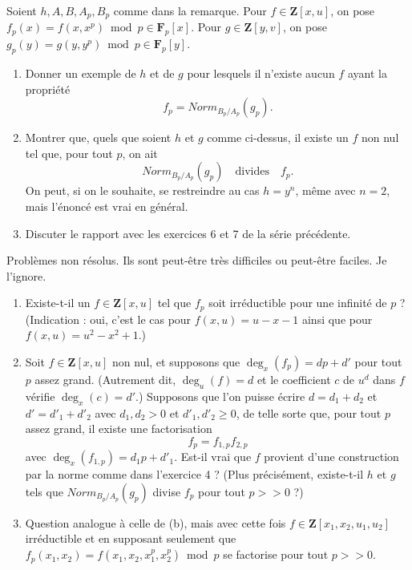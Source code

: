 \begin{exercise}
\label{exercise-strange-fp-3}
Soient $h, A, B, A_p, B_p$ comme dans la remarque. Pour $f \in {\mathbf Z}[x, u]$, on
pose $f_p(x) = f(x, x^p) \bmod p \in {\mathbf F}_p[x]$. Pour
$g \in {\mathbf Z}[y, v]$, on pose
$g_p(y) = g(y, y^p) \bmod p \in {\mathbf F}_p[y]$.
\begin{enumerate}
\item Donner un exemple de $h$ et de $g$ pour lesquels
il n'existe aucun $f$ ayant la propriété
$$
f_p  =  Norm_{B_p/A_p}(g_p).
$$
\item Montrer que, quels que soient $h$ et $g$ comme ci-dessus,
il existe un $f$ non nul tel que, pour tout $p$, on ait
$$
Norm_{B_p/A_p}(g_p)\quad\text{divides}\quad f_p .
$$
On peut, si on le souhaite, se restreindre au cas $h = y^n$, même avec $n = 2$,
mais l'énoncé est vrai en général.
\item Discuter le rapport avec les exercices 6 et 7 de la série
précédente.
\end{enumerate}
\end{exercise}

\begin{exercise}
\label{exercise-strange-fp-unsolved}
Problèmes non résolus. Ils sont peut-être très difficiles ou peut-être faciles.
Je l'ignore.
\begin{enumerate}
\item Existe-t-il un $f \in {\mathbf Z}[x, u]$ tel que $f_p$ soit
irréductible pour une infinité de $p$ ? (Indication : oui, c'est le cas pour
$f(x, u) = u - x - 1$ ainsi que pour $f(x, u) = u^2 - x^2 + 1$.)
\item Soit $f \in {\mathbf Z}[x, u]$ non nul, et supposons que
$\deg_x(f_p) = dp + d'$ pour tout $p$ assez grand. (Autrement dit, $\deg_u(f) = d$
et le coefficient $c$ de $u^d$ dans $f$ vérifie $\deg_x(c) = d'$.) Supposons que l'on
puisse écrire $d = d_1 + d_2$ et $d' = d'_1 + d'_2$ avec $d_1, d_2 > 0$
et $d'_1, d'_2 \geq 0$, de telle sorte que, pour tout $p$ assez grand,
il existe une factorisation
$$
f_p = f_{1, p} f_{2, p}
$$
avec $\deg_x(f_{1, p}) = d_1p + d'_1$. Est-il vrai que $f$ provient d'une
construction par la norme comme dans l'exercice 4 ? (Plus précisément, existe-t-il $h$ et
$g$ tels que $Norm_{B_p/A_p}(g_p)$ divise $f_p$ pour tout $p >> 0$ ?)
\item Question analogue à celle de (b), mais avec cette fois
$f \in {\mathbf Z}[x_1, x_2, u_1, u_2]$ irréductible et en supposant seulement que
$f_p(x_1, x_2) = f(x_1, x_2, x_1^p, x_2^p) \bmod p$ se factorise pour tout
$p >> 0$.
\end{enumerate}
\end{exercise}


















